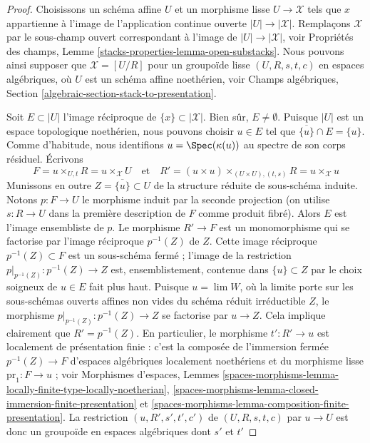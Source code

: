 \begin{proof}
Choisissons un schéma affine $U$ et un morphisme lisse
$U \to \mathcal{X}$ tels que $x$ appartienne à l'image de l'application
continue ouverte $|U| \to |\mathcal{X}|$. Remplaçons $\mathcal{X}$ par le
sous-champ ouvert correspondant à l'image de $|U| \to |\mathcal{X}|$, voir
Propriétés des champs, Lemme \ref{stacks-properties-lemma-open-substacks}.
Nous pouvons ainsi supposer que $\mathcal{X} = [U/R]$ pour un groupoïde lisse
$(U, R, s, t, c)$ en espaces algébriques, où $U$ est un schéma affine
noethérien, voir Champs algébriques, Section
\ref{algebraic-section-stack-to-presentation}.

\medskip\noindent
Soit $E \subset |U|$ l'image réciproque de
$\{x\} \subset |\mathcal{X}|$. Bien sûr, $E \not = \emptyset$.
Puisque $|U|$ est un espace topologique noethérien, nous pouvons choisir
$u \in E$ tel que $\overline{\{u\}} \cap E = \{u\}$.
Comme d'habitude, nous identifions $u = \Spec(\kappa(u))$ au spectre de son
corps résiduel. Écrivons
$$
F = u \times_{U, t} R = u \times_\mathcal{X} U
\quad\text{et}\quad
R' = (u \times u) \times_{(U \times U), (t, s)} R = u \times_\mathcal{X} u
$$
Munissons en outre $Z = \overline{\{u\}} \subset U$ de la structure réduite
de sous-schéma induite. Notons $p : F \to U$ le morphisme induit par la
seconde projection (on utilise $s : R \to U$ dans la première description
de $F$ comme produit fibré). Alors $E$ est l'image ensembliste de $p$.
Le morphisme $R' \to F$ est un monomorphisme qui se factorise par l'image
réciproque $p^{-1}(Z)$ de $Z$. Cette image réciproque
$p^{-1}(Z) \subset F$ est un sous-schéma fermé ; l'image de la restriction
$p|_{p^{-1}(Z)} : p^{-1}(Z) \to Z$ est, ensemblistement, contenue dans
$\{u\} \subset Z$ par le choix soigneux de $u \in E$ fait plus haut.
Puisque $u = \lim W$, où la limite porte sur les
sous-schémas ouverts affines non vides du schéma réduit irréductible $Z$,
le morphisme $p|_{p^{-1}(Z)} : p^{-1}(Z) \to Z$ se factorise par
$u \to Z$. Cela implique clairement que $R' = p^{-1}(Z)$. En particulier,
le morphisme $t' : R' \to u$ est localement de présentation finie : c'est la
composée de l'immersion fermée $p^{-1}(Z) \to F$ d'espaces algébriques
localement noethériens et du morphisme lisse $\text{pr}_1 : F \to u$ ; voir
Morphismes d'espaces, Lemmes
\ref{spaces-morphisms-lemma-locally-finite-type-locally-noetherian},
\ref{spaces-morphisms-lemma-closed-immersion-finite-presentation} et
\ref{spaces-morphisms-lemma-composition-finite-presentation}.
La restriction $(u, R', s', t', c')$ de $(U, R, s, t, c)$ par
$u \to U$ est donc un groupoïde en espaces algébriques dont $s'$ et $t'$

\end{proof}
